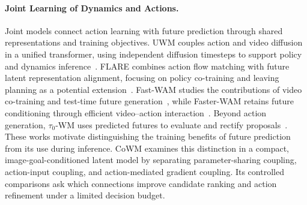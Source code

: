 \paragraph{Joint Learning of Dynamics and Actions.}
Joint models connect action learning with future prediction through shared representations and training objectives. UWM couples action and video diffusion in a unified transformer, using independent diffusion timesteps to support policy and dynamics inference~\cite{zhu2025uwm}. FLARE combines action flow matching with future latent representation alignment, focusing on policy co-training and leaving planning as a potential extension~\cite{zheng2025flare}. Fast-WAM studies the contributions of video co-training and test-time future generation~\cite{yuan2026fastwam}, while Faster-WAM retains future conditioning through efficient video--action interaction~\cite{zhao2026fasterwam}. Beyond action generation, $\tau_0$-WM uses predicted futures to evaluate and rectify proposals~\cite{zhou2026tauwm}. These works motivate distinguishing the training benefits of future prediction from its use during inference. CoWM examines this distinction in a compact, image-goal-conditioned latent model by separating parameter-sharing coupling, action-input coupling, and action-mediated gradient coupling. Its controlled comparisons ask which connections improve candidate ranking and action refinement under a limited decision budget.
